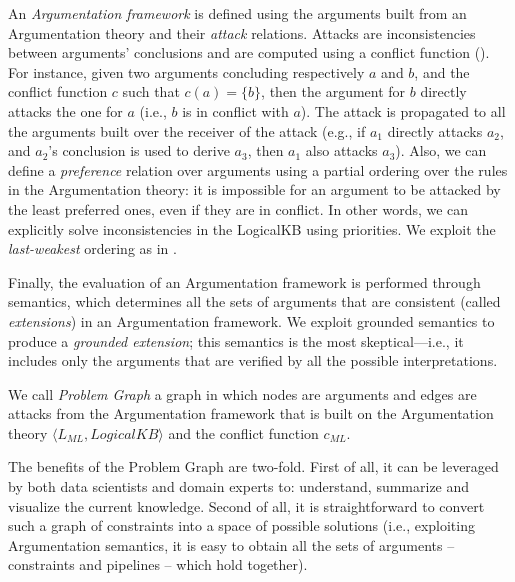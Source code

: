 An \emph{Argumentation framework} is defined using the arguments built from an Argumentation theory and their \emph{attack} relations.
Attacks are inconsistencies between arguments' conclusions and are computed using a conflict function ().
For instance, given two arguments concluding respectively $a$ and $b$, and the conflict function $c$ such that $c(a) = \{b\}$, then the argument for $b$ directly attacks the one for $a$ (i.e., $b$ is in conflict with $a$).
The attack is propagated to all the arguments built over the receiver of the attack (e.g., if $a_1$ directly attacks $a_2$, and $a_2$'s conclusion is used to derive $a_3$, then $a_1$ also attacks $a_3$).
Also, we can define a \emph{preference} relation over arguments using a partial ordering over the rules in the Argumentation theory:
it is impossible for an argument to be attacked by the least preferred ones, even if they are in conflict.
In other words, we can explicitly solve inconsistencies in the LogicalKB using priorities.
We exploit the \emph{last-weakest} ordering as in \cite{Modgil2014aspic+}.

Finally, the evaluation of an Argumentation framework is performed through semantics, which determines all the sets of arguments that are consistent (called \emph{extensions}) in an Argumentation framework.
We exploit grounded semantics \cite{Dung1995abstractArg} to produce a \emph{grounded extension}; this semantics is the most skeptical---i.e., it includes only the arguments that are verified by all the possible interpretations. %

\begin{definition}
We call \emph{Problem Graph} a graph in which nodes are arguments and edges are attacks from the Argumentation framework that is built on the Argumentation theory $\langle L_{ML}, LogicalKB \rangle$ and the conflict function $c_{ML}$.
\end{definition}

The benefits of the Problem Graph are two-fold.
First of all, it can be leveraged by both data scientists and domain experts to: understand, summarize and visualize the current knowledge.
Second of all, it is straightforward to convert such a graph of constraints into a space of possible solutions (i.e., exploiting Argumentation semantics, it is easy to obtain all the sets of arguments -- constraints and pipelines -- which hold together).

